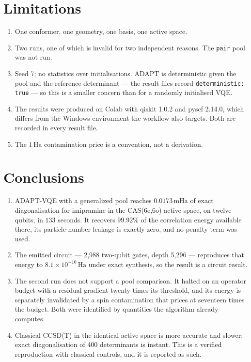 \documentclass[11pt,a4paper]{article}
\newcommand{\mHa}{\ensuremath{\,\mathrm{mHa}}}
\newcommand{\Ha}{\ensuremath{\,\mathrm{Ha}}}
\newcommand{\code}[1]{\texttt{\small #1}}
\begin{document}
\section{Limitations}

\begin{enumerate}[leftmargin=1.4em,itemsep=0.2em]
\item One conformer, one geometry, one basis, one active space.
\item Two runs, one of which is invalid for two independent reasons. The
  \code{pair} pool was not run.
\item Seed 7; no statistics over initialisations. ADAPT is deterministic given
  the pool and the reference determinant --- the result files record
  \code{deterministic: true} --- so this is a smaller concern than for a
  randomly initialised VQE.
\item The results were produced on Colab with qiskit 1.0.2 and pyscf 2.14.0,
  which differs from the Windows environment the workflow also targets. Both are
  recorded in every result file.
\item The $1\Ha$ contamination price is a convention, not a derivation.
\end{enumerate}

\section{Conclusions}

\sloppy
\begin{enumerate}[leftmargin=1.4em,itemsep=0.25em]

\item ADAPT-VQE with a generalized pool reaches $0.0173\mHa$ of exact
  diagonalisation for imipramine in the CAS(6e,6o) active space, on twelve
  qubits, in $133$ seconds. It recovers $99.92\%$ of the correlation energy
  available there, its particle-number leakage is exactly zero, and no penalty
  term was used.

\item The emitted circuit --- 2{,}988 two-qubit gates, depth 5{,}296 ---
  reproduces that energy to $8.1\times10^{-10}\Ha$ under exact synthesis, so the
  result is a circuit result.

\item The second run does not support a pool comparison. It halted on an
  operator budget with a residual gradient twenty times its threshold, and its
  energy is separately invalidated by a spin contamination that prices at
  seventeen times the budget. Both were identified by quantities the algorithm
  already computes.

\item Classical CCSD(T) in the identical active space is more accurate and
  slower; exact diagonalisation of 400 determinants is instant. This is a
  verified reproduction with classical controls, and it is reported as such.

\end{enumerate}
\fussy
\end{document}

